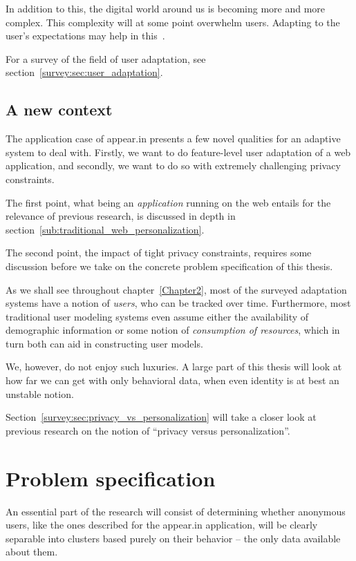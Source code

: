 In addition to this, the digital world around us is becoming more and more complex. This complexity will at some point overwhelm users. Adapting to the user's expectations may help in this~\cite{Vrieze}.

For a survey of the field of user adaptation, see section~\ref{survey:sec:user_adaptation}.

\subsection{A new context}
\label{intro:sub:adaptation_context}

The application case of appear.in presents a few novel qualities for an adaptive system to deal with. Firstly, we want to do feature-level user adaptation of a web application, and secondly, we want to do so with extremely challenging privacy constraints.

The first point, what being an \emph{application} running on the web entails for the relevance of previous research, is discussed in depth in section~\ref{sub:traditional_web_personalization}.

The second point, the impact of tight privacy constraints, requires some discussion before we take on the concrete problem specification of this thesis.

As we shall see throughout chapter~\ref{Chapter2}, most of the surveyed adaptation systems have a notion of \emph{users}, who can be tracked over time. Furthermore, most traditional user modeling systems even assume either the availability of demographic information or some notion of \emph{consumption of resources}, which in turn both can aid in constructing user models.

We, however, do not enjoy such luxuries. A large part of this thesis will look at how far we can get with only behavioral data, when even identity is at best an unstable notion.

Section~\ref{survey:sec:privacy_vs_personalization} will take a closer look at previous research on the notion of ``privacy versus personalization''.

\section{Problem specification}
\label{sec:problem_specification}

An essential part of the research will consist of determining whether anonymous users, like the ones described for the appear.in application, will be clearly separable into clusters based purely on their behavior -- the only data available about them.

